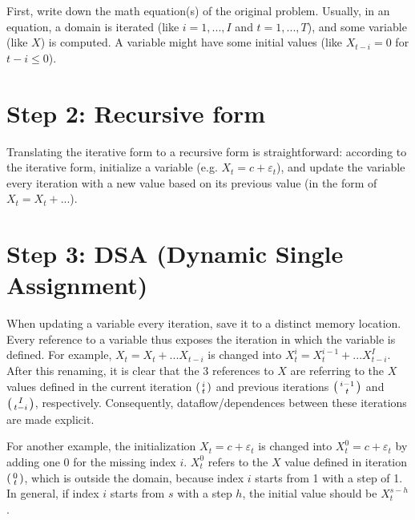 First, write down the math equation(s) of the original problem. Usually, in an  equation, a domain  is iterated (like $i=1,...,I$ and $t=1,...,T$),  and some variable (like $X$) is computed. A variable might have some initial values (like $X_{t-i}=0$ for $t-i \le 0$).

\section{Step 2: Recursive form}

Translating the iterative form to a recursive form is straightforward: according to the iterative form, initialize a variable (e.g. $X_t=c+\varepsilon_t$), and update the variable every iteration with a new value based on its previous value (in the form of $X_t=X_t+...$).

\section{Step 3: DSA (Dynamic Single Assignment)}

When updating a variable every iteration, save it to a distinct memory location. Every reference to a variable thus exposes the iteration in which the variable is defined. For example, $X_t=X_t + ... X_{t-i}$ is changed into  $X_t^i=X_t^{i-1} + ... X_{t-i}^I$. After this renaming, it is clear that the 3 references to $X$ are referring to the $X$ values defined in the current iteration $\begin{psmallmatrix}i\\t\end{psmallmatrix}$ and previous iterations $\begin{psmallmatrix}i-1\\t\end{psmallmatrix}$ and $\begin{psmallmatrix}I\\t-i\end{psmallmatrix}$, respectively. 
Consequently, dataflow/dependences between these iterations are made explicit.  

For another example, the initialization $X_t=c+\varepsilon_t$ is changed into  $X_t^0=c+\varepsilon_t$ by adding one 0 for the missing index $i$. $X_t^0$ refers to the $X$ value defined in iteration $\begin{psmallmatrix}0\\t\end{psmallmatrix}$, which is outside the domain, because index $i$ starts from 1 with a step of 1. In general, if index $i$ starts from $s$ with a step $h$, the initial value should be $X_t^{s-h}$.

